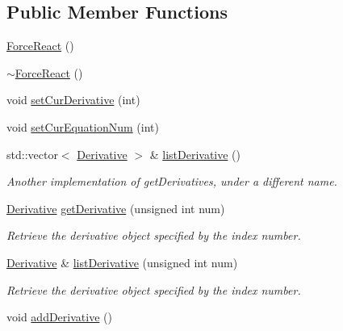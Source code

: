 \subsection*{Public Member Functions}
\begin{DoxyCompactItemize}
\item 
\hyperlink{classosea_1_1ofreq_1_1_force_react_ac8f8b24f67f93f43ae1bb9c464a2d8d4}{Force\-React} ()
\item 
\hyperlink{classosea_1_1ofreq_1_1_force_react_a585f55d5c31c4951824bce98b6582afb}{$\sim$\-Force\-React} ()
\item 
void \hyperlink{classosea_1_1ofreq_1_1_force_react_ac387126f0628a06b24f53012725e384f}{set\-Cur\-Derivative} (int)
\item 
void \hyperlink{classosea_1_1ofreq_1_1_force_react_aca5dc15ce68dd63183aced244c13992c}{set\-Cur\-Equation\-Num} (int)
\item 
std\-::vector$<$ \hyperlink{classosea_1_1ofreq_1_1_derivative}{Derivative} $>$ \& \hyperlink{classosea_1_1ofreq_1_1_force_react_a3c399af8c10b2dbf374c13d85917275e}{list\-Derivative} ()
\begin{DoxyCompactList}\small\item\em Another implementation of get\-Derivatives, under a different name. \end{DoxyCompactList}\item 
\hyperlink{classosea_1_1ofreq_1_1_derivative}{Derivative} \hyperlink{classosea_1_1ofreq_1_1_force_react_aaa5876da8ade31366fc75e3bb5d6ba42}{get\-Derivative} (unsigned int num)
\begin{DoxyCompactList}\small\item\em Retrieve the derivative object specified by the index number. \end{DoxyCompactList}\item 
\hyperlink{classosea_1_1ofreq_1_1_derivative}{Derivative} \& \hyperlink{classosea_1_1ofreq_1_1_force_react_a9966751cff2a417cfe04658a0038aa1b}{list\-Derivative} (unsigned int num)
\begin{DoxyCompactList}\small\item\em Retrieve the derivative object specified by the index number. \end{DoxyCompactList}\item 
\hypertarget{classosea_1_1ofreq_1_1_force_react_a1aad01d74720d18fd21dd9f70a8b6702}{void \hyperlink{classosea_1_1ofreq_1_1_force_react_a1aad01d74720d18fd21dd9f70a8b6702}{add\-Derivative} ()}\label{classosea_1_1ofreq_1_1_force_react_a1aad01d74720d18fd21dd9f70a8b6702}


\end{DoxyCompactItemize}
